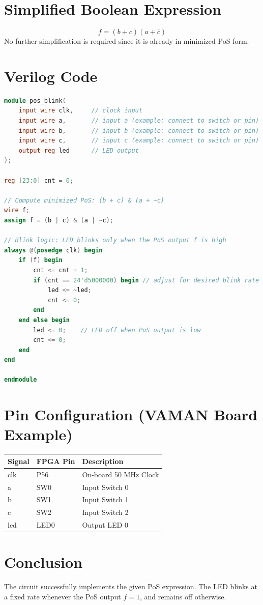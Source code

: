 \documentclass[a4paper,12pt]{article}
\begin{document}
\section*{Simplified Boolean Expression}
\[
f = (b + c)(a + \overline{c})
\]
No further simplification is required since it is already in minimized PoS form.

\section*{Verilog Code}
\begin{lstlisting}[language=Verilog, caption={Verilog code for PoS-based LED blink}]
module pos_blink(
    input wire clk,     // clock input
    input wire a,       // input a (example: connect to switch or pin)
    input wire b,       // input b (example: connect to switch or pin)
    input wire c,       // input c (example: connect to switch or pin)
    output reg led      // LED output
);

reg [23:0] cnt = 0;

// Compute minimized PoS: (b + c) & (a + ~c)
wire f;
assign f = (b | c) & (a | ~c);

// Blink logic: LED blinks only when the PoS output f is high
always @(posedge clk) begin
    if (f) begin
        cnt <= cnt + 1;
        if (cnt == 24'd5000000) begin // adjust for desired blink rate
            led <= ~led;
            cnt <= 0;
        end
    end else begin
        led <= 0;    // LED off when PoS output is low
        cnt <= 0;
    end
end

endmodule
\end{lstlisting}

\section*{Pin Configuration (VAMAN Board Example)}
\begin{center}
\begin{tabular}{lll}
\toprule
\textbf{Signal} & \textbf{FPGA Pin} & \textbf{Description} \\
\midrule
clk & P56 & On-board 50 MHz Clock \\
a & SW0 & Input Switch 0 \\
b & SW1 & Input Switch 1 \\
c & SW2 & Input Switch 2 \\
led & LED0 & Output LED 0 \\
\bottomrule
\end{tabular}
\end{center}

\section*{Conclusion}
The circuit successfully implements the given PoS expression.  
The LED blinks at a fixed rate whenever the PoS output \( f = 1 \), and remains off otherwise.
\end{document}
